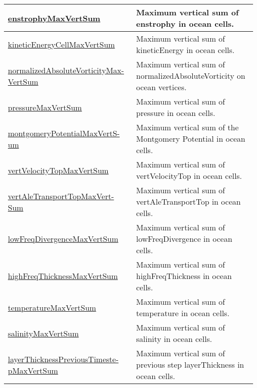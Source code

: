 {\begin{center}
\begin{longtable}{| p{2.0in} | p{4.0in} |}
    \hline
    \hyperref[subsec:var_sec_globalStatsAM_enstrophyMaxVertSum]{enstrophyMaxVertSum} & Maximum vertical sum of enstrophy in ocean cells. \\
    \hline
    \hyperref[subsec:var_sec_globalStatsAM_kineticEnergyCellMaxVertSum]{kineticEnergyCellMaxVertSum} & Maximum vertical sum of kineticEnergy in ocean cells. \\
    \hline
    \hyperref[subsec:var_sec_globalStatsAM_normalizedAbsoluteVorticityMaxVertSum]{normalizedAbsoluteVorticityMax-}\hyperref[subsec:var_sec_globalStatsAM_normalizedAbsoluteVorticityMaxVertSum]{VertSum}  & Maximum vertical sum of normalizedAbsoluteVorticity on ocean vertices. \\
    \hline
    \hyperref[subsec:var_sec_globalStatsAM_pressureMaxVertSum]{pressureMaxVertSum} & Maximum vertical sum of pressure in ocean cells. \\
    \hline
    \hyperref[subsec:var_sec_globalStatsAM_montgomeryPotentialMaxVertSum]{montgomeryPotentialMaxVertS-}\hyperref[subsec:var_sec_globalStatsAM_montgomeryPotentialMaxVertSum]{um}  & Maximum vertical sum of the Montgomery Potential in ocean cells. \\
    \hline
    \hyperref[subsec:var_sec_globalStatsAM_vertVelocityTopMaxVertSum]{vertVelocityTopMaxVertSum} & Maximum vertical sum of vertVelocityTop in ocean cells. \\
    \hline
    \hyperref[subsec:var_sec_globalStatsAM_vertAleTransportTopMaxVertSum]{vertAleTransportTopMaxVert-}\hyperref[subsec:var_sec_globalStatsAM_vertAleTransportTopMaxVertSum]{Sum}  & Maximum vertical sum of vertAleTransportTop in ocean cells. \\
    \hline
    \hyperref[subsec:var_sec_globalStatsAM_lowFreqDivergenceMaxVertSum]{lowFreqDivergenceMaxVertSum} & Maximum vertical sum of lowFreqDivergence in ocean cells. \\
    \hline
    \hyperref[subsec:var_sec_globalStatsAM_highFreqThicknessMaxVertSum]{highFreqThicknessMaxVertSum} & Maximum vertical sum of highFreqThickness in ocean cells. \\
    \hline
    \hyperref[subsec:var_sec_globalStatsAM_temperatureMaxVertSum]{temperatureMaxVertSum} & Maximum vertical sum of temperature in ocean cells. \\
    \hline
    \hyperref[subsec:var_sec_globalStatsAM_salinityMaxVertSum]{salinityMaxVertSum} & Maximum vertical sum of salinity in ocean cells. \\
    \hline
    \hyperref[subsec:var_sec_globalStatsAM_layerThicknessPreviousTimestepMaxVertSum]{layerThicknessPreviousTimeste-}\hyperref[subsec:var_sec_globalStatsAM_layerThicknessPreviousTimestepMaxVertSum]{pMaxVertSum}  & Maximum vertical sum of previous step layerThickness in ocean cells. \\

\end{longtable}
\end{center}}
